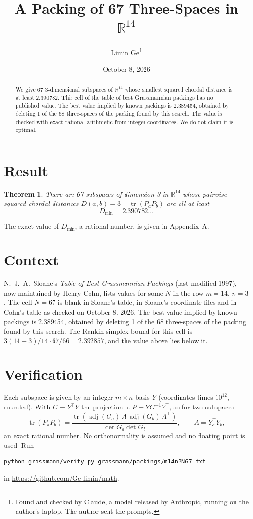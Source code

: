\documentclass[11pt,a4paper]{article}
\title{A Packing of 67 Three-Spaces in $\mathbb{R}^{14}$}
\author{Limin Ge\thanks{Found and checked by Claude, a model released by Anthropic, running on the author's laptop. The author sent the prompts.}}
\date{October 8, 2026}
\newtheorem*{theorem}{Theorem}
\begin{document}
\maketitle
\begin{abstract}
We give 67 3-dimensional subspaces of $\mathbb{R}^{14}$ whose smallest squared chordal distance is at least 2.390782. This cell of the table of best Grassmannian packings has no published value. The best value implied by known packings is 2.389454, obtained by deleting 1 of the 68 three-spaces of the packing found by this search. The value is checked with exact rational arithmetic from integer coordinates. We do not claim it is optimal.
\end{abstract}

\section{Result}
\begin{theorem}
There are 67 subspaces of dimension 3 in $\mathbb{R}^{14}$ whose pairwise squared chordal distances $D(a,b) = 3 - \operatorname{tr}(P_aP_b)$ are all at least
\[ D_{\min} = 2.390782\ldots \]
\end{theorem}
The exact value of $D_{\min}$, a rational number, is given in Appendix~A.


\section{Context}
N.~J.~A.~Sloane's \emph{Table of Best Grassmannian Packings} (last modified 1997), now maintained by Henry Cohn, lists values for some $N$ in the row $m=14$, $n=3$. The cell $N=67$ is blank in Sloane's table, in Sloane's coordinate files and in Cohn's table as checked on October 8, 2026. The best value implied by known packings is 2.389454, obtained by deleting 1 of the 68 three-spaces of the packing found by this search. The Rankin simplex bound for this cell is $3(14-3)/14\cdot 67/66 = 2.392857$, and the value above lies below it.


\section{Verification}
Each subspace is given by an integer $m\times n$ basis $Y$ (coordinates times $10^{12}$, rounded). With $G=Y^\top Y$ the projection is $P=YG^{-1}Y^\top$, so for two subspaces
\[ \operatorname{tr}(P_aP_b)=\frac{\operatorname{tr}(\operatorname{adj}(G_a)\,A\,\operatorname{adj}(G_b)\,A^\top)}{\det G_a\det G_b},\qquad A=Y_a^\top Y_b, \]
an exact rational number. No orthonormality is assumed and no floating point is used. Run
\begin{verbatim}
python grassmann/verify.py grassmann/packings/m14n3N67.txt
\end{verbatim}
in \url{https://github.com/Ge-limin/math}.
\end{document}
